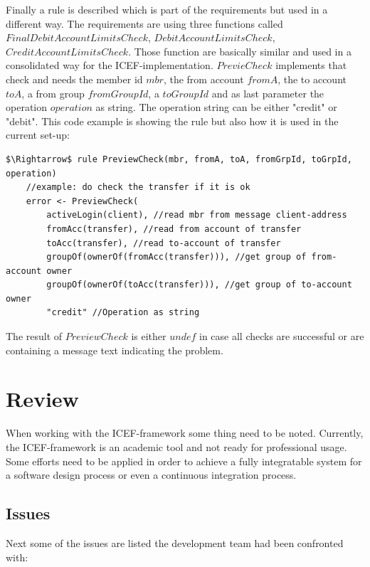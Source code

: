 Finally a rule is described which is part of the requirements but used in a different way. The requirements are using three functions called $FinalDebitAccountLimitsCheck$, $DebitAccountLimitsCheck$, $CreditAccountLimitsCheck$. Those function are basically similar and used in a consolidated way for the ICEF-implementation. $PrevieCheck$ implements that check and needs the member id $mbr$, the from account $fromA$, the to account $toA$, a from group $fromGroupId$, a $toGroupId$ and as last parameter the operation $operation$ as string. The operation string can be either "credit" or "debit". This code example is showing the rule but also how it is used in the current set-up:

\begin{lstlisting}[language=bsl,mathescape=true]
	$\Rightarrow$ rule PreviewCheck(mbr, fromA, toA, fromGrpId, toGrpId, operation)
	//example: do check the transfer if it is ok
	error <- PreviewCheck(
		activeLogin(client), //read mbr from message client-address
		fromAcc(transfer), //read from account of transfer
		toAcc(transfer), //read to-account of transfer
		groupOf(ownerOf(fromAcc(transfer))), //get group of from-account owner
		groupOf(ownerOf(toAcc(transfer))), //get group of to-account owner
		"credit" //Operation as string
\end{lstlisting}

The result of $PreviewCheck$ is either $undef$ in case all checks are successful or are containing a message text indicating the problem.

\section{Review}
\label{sec:impl-issues}

When working with the ICEF-framework some thing need to be noted. Currently, the ICEF-framework is an academic tool and not ready for professional usage. Some efforts need to be applied in order to achieve a fully integratable system for a software design process or even a continuous integration process.

\subsection{Issues}

Next some of the issues are listed the development team had been confronted with:

